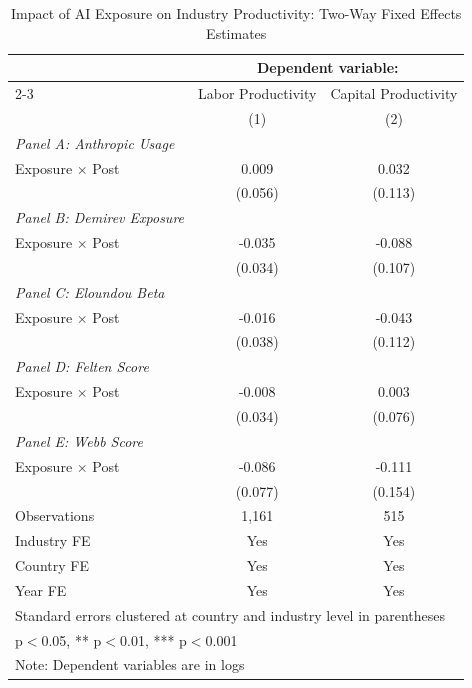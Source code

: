 \documentclass[11pt]{article}
\begin{document}
\begin{table}[H]
\centering
\caption{Impact of AI Exposure on Industry Productivity: Two-Way Fixed Effects Estimates}
\begin{tabular}{lcc}
\hline\hline
 & \multicolumn{2}{c}{Dependent variable:} \\
\cmidrule{2-3}
 & Labor Productivity & Capital Productivity \\
 & (1) & (2) \\
\midrule
\textit{Panel A: Anthropic Usage} & & \\
Exposure $\times$ Post & 0.009 & 0.032 \\
 & (0.056) & (0.113) \\
\midrule
\textit{Panel B: Demirev Exposure} & & \\
Exposure $\times$ Post & -0.035 & -0.088 \\
 & (0.034) & (0.107) \\
\midrule
\textit{Panel C: Eloundou Beta} & & \\
Exposure $\times$ Post & -0.016 & -0.043 \\
 & (0.038) & (0.112) \\
\midrule
\textit{Panel D: Felten Score} & & \\
Exposure $\times$ Post & -0.008 & 0.003 \\
 & (0.034) & (0.076) \\
\midrule
\textit{Panel E: Webb Score} & & \\
Exposure $\times$ Post & -0.086 & -0.111 \\
 & (0.077) & (0.154) \\
\midrule
Observations & 1,161 & 515 \\
Industry FE & Yes & Yes \\
Country FE & Yes & Yes \\
Year FE & Yes & Yes \\
\hline\hline
\multicolumn{3}{l}{\footnotesize Standard errors clustered at country and industry level in parentheses} \\
\multicolumn{3}{l}{\footnotesize * p$<$0.05, ** p$<$0.01, *** p$<$0.001} \\
\multicolumn{3}{l}{\footnotesize Note: Dependent variables are in logs} \\
\end{tabular}
\label{table:industry_twfe}
\end{table}
\end{document}
